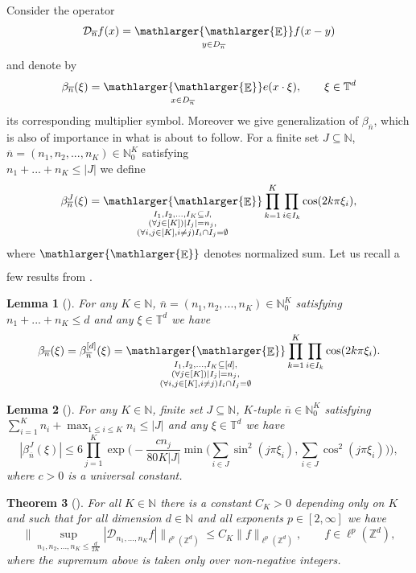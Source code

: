 \documentclass[a4paper,oneside, reqno]{amsart}
\numberwithin{equation}{section}
\newtheorem{Thm}{Theorem}[section]
\newtheorem{Lem}[Thm]{Lemma}
\theoremstyle{definition}%
\theoremstyle{definition}
\theoremstyle{definition}%
\theoremstyle{definition}
\newcommand{\E}{\mathop{\mathbb{E}}}
\newcommand{\Z}{\mathbb{Z}}
\newcommand{\N}{\mathbb{N}}
\newcommand{\T}{\mathbb{T}}
\newcommand{\se}[1]{\underset{_{\substack{#1}}}{\mathlarger{\mathlarger{\E}}}}
\begin{document}
Consider the operator
\[
\mathcal{D}_{\overline{n}}f(x)= \se{y \in D_{\overline{n}}}f(x-y)
\]
and denote by
\begin{equation}
\label{eq:bon}
  \beta_{\overline{n}}(\xi)=\se{x \in D_{\overline{n}}} e(x \cdot \xi),\qquad \xi\in\T^d
\end{equation}
its corresponding multiplier symbol. Moreover we give generalization of $\beta_{\overline{n}}$, which is also of importance in what is about to follow. For a finite set $J \subseteq \N$, $\overline{n}=(n_1,n_2,...,n_K) \in \N_0^K$ satisfying \\ $n_1+...+n_K \le |J| $ we define
    \begin{equation} \label{generalised beta defn}
    \beta_{\overline{n}}^J(\xi)=\se{\substack{I_1,I_2,...,I_K \subseteq J, \\
    (\forall j \in [K]) |I_j|=n_j, \\
    (\forall i,j \in [K], i \neq j) I_i \cap I_j=\emptyset
    }} \prod_{k=1}^K \prod_{i \in I_k} \cos(2k \pi \xi_i),
    \end{equation}
    where $\se{}$ denotes normalized sum. Let us recall a few results from \cite{NW}.
    \begin{Lem}[{\cite[Lemma 2.2]{NW}}]
    \label{lem:2.2 from NW}
    For any $K \in \N$, $\overline{n}=(n_1,n_2,...,n_K) \in \N_0^K$ satisfying \\ $n_1+...+n_K \le d $ and any $\xi \in \T^d$
    we have
    \[
    \beta_{\overline{n}}(\xi)=\beta_{\overline{n}}^{[d]}(\xi)=\se{\substack{I_1,I_2,...,I_K \subseteq [d], \\
    (\forall j \in [K]) |I_j|=n_j, \\
    (\forall i,j \in [K], i \neq j) I_i \cap I_j=\emptyset
    }} \prod_{k=1}^K \prod_{i \in I_k} \cos(2k \pi \xi_i).
    \]
\end{Lem}
\begin{Lem}[{\cite[Lemma 2.8]{NW}}] \label{lem:2.8 from NW}
For any $K \in \N$, finite set  $J \subseteq \N$, $K$-tuple  $\overline{n} \in \N_0^K$ satisfying \\ $ \sum_{i=1}^K n_i + \max_{1 \leq i \leq K} n_i \leq |J|$ and any $\xi \in \T^d$ we have
    \[
    |\beta^J_{\overline{n}}(\xi)| \leq 6 \prod_{j=1}^K \exp\Big(- \frac{cn_j}{80 K|J|} \min\Big( \sum_{i \in J} \sin^2(j \pi \xi_i), \sum_{i \in J} \cos^2(j \pi \xi_i)\Big) \Big),
    \]
    where $c>0$ is a universal constant.
\end{Lem}
\begin{Thm}[{\cite[Theorem 1.5]{NW}}] \label{thm:1.5 from NW} 
For all $K \in \N$ there is a constant $C_K>0$ depending only on $K$ and such that for all dimension $d\in\N$ and all exponents $p\in[2,\infty]$ we have
\[
 \Big\| \sup_{ n_1,n_2,...,n_K \leq \frac{d}{2K}} |\mathcal{D}_{n_1,...,n_K}f| \Big\|_{\ell^p(\Z^d)} \leq C_K \big\| f \big\|_{\ell^p(\Z^d)}, \qquad f\in\ell^p(\Z^d),
\]
where the supremum above is taken only over non-negative integers.
\end{Thm}
\end{document}
